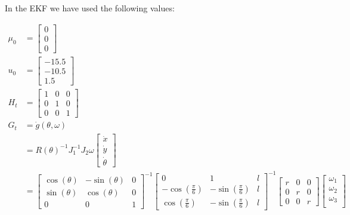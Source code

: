 \documentclass{article}
\begin{document}
In the EKF we have used the following values:

\begin{align*}
	\mu_{0} &= 
		\begin{bmatrix}
			0 \\
			0 \\
			0
		\end{bmatrix} \\
	u_{0} &= 
	\begin{bmatrix}
		-15.5 \\
		-10.5 \\
		1.5
	\end{bmatrix} \\
	H_{t} &=
	\begin{bmatrix}
		1 & 0 & 0 \\
		0 & 1 & 0 \\
		0 & 0 & 1
	\end{bmatrix} \\
	G_{t} &= \dot{g}(\theta, \omega) \\
		&= R(\theta)^{-1} J_{1}^{-1} J_{2} \omega
	    \begin{bmatrix}
	        \dot{x} \\
	        \dot{y} \\
	        \dot{\theta}
	    \end{bmatrix} \\
	    &= 
	        \begin{bmatrix}
		        \cos{(\theta)} & -\sin{(\theta)} & 0 \\
		        \sin{(\theta)} & \cos{(\theta)} & 0 \\
		        0 & 0 & 1
	        \end{bmatrix}^{-1}
	        \begin{bmatrix}
	            0 & 1 & l \\
	          	-\cos(\frac{\pi}{6}) & -\sin(\frac{\pi}{6}) & l \\
	        	\cos(\frac{\pi}{6}) & -\sin(\frac{\pi}{6}) & l
	        \end{bmatrix}^{-1}
	        \begin{bmatrix}
	            r & 0 & 0 \\
	            0 & r & 0 \\
	            0 & 0 & r
	        \end{bmatrix}
		    \begin{bmatrix}
		       \omega_{1} \\
		       \omega_{2} \\
		       \omega_{3} \\
		    \end{bmatrix} \\
\end{align*}
\end{document}

